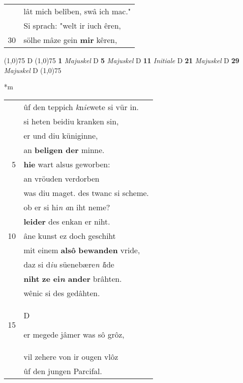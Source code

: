 \documentclass[8pt,a4paper,notitlepage]{article}
\begin{document}
\begin{table}[ht]
\begin{minipage}[t]{0.5\linewidth}
\begin{tabular}{rl}
 & lât mich belîben, swâ ich mac."\\ 
 & Si sprach: "welt ir iuch êren,\\ 
30 & sölhe mâze gein \textbf{mir} kêren,\\ 
\end{tabular}
\scriptsize
\line(1,0){75} \newline
D \newline
\line(1,0){75} \newline
\textbf{1} \textit{Majuskel} D  \textbf{5} \textit{Majuskel} D  \textbf{11} \textit{Initiale} D  \textbf{21} \textit{Majuskel} D  \textbf{29} \textit{Majuskel} D  \newline
\line(1,0){75} \newline
\newline
\end{minipage}
\hspace{0.5cm}
\begin{minipage}[t]{0.5\linewidth}
\small
\begin{center}*m
\end{center}
\begin{tabular}{rl}
 & ûf den teppich \textit{k}n\textit{ie}wete si vür in.\\ 
 & si heten beidiu kranken sin,\\ 
 & er und diu küniginne,\\ 
 & an \textbf{beligen der} minne.\\ 
5 & \textbf{hie} wart alsus geworben:\\ 
 & an vröuden verdorben\\ 
 & was diu maget. des twanc si scheme.\\ 
 & ob er si hi\textit{n} \textit{a}n iht neme?\\ 
 & \textbf{leider} des enkan er niht.\\ 
10 & âne kunst ez doch geschiht\\ 
 & mit einem \textbf{alsô} \textbf{bewanden} vride,\\ 
 & daz si d\textit{iu} süenebære\textit{n} \textit{l}ide\\ 
 & \textbf{niht} \textbf{ze ei\textit{n} ander} brâhten.\\ 
 & wênic si des gedâhten.\\ 
15 & \begin{large}D\end{large}er megede jâmer was sô grôz,\\ 
 & vil zehere von ir ougen vlôz\\ 
 & ûf den jungen Parcifal.\\ 

\end{tabular}
\end{minipage}
\end{table}
\end{document}
